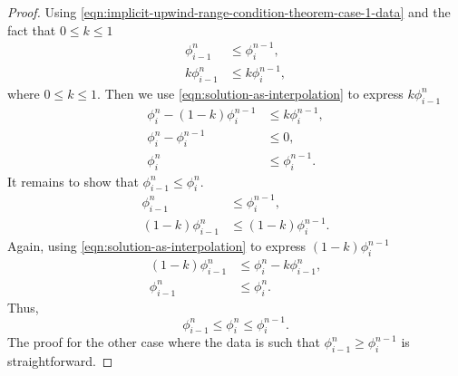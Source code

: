 \documentclass[../thesis.tex]{subfiles}
\begin{document}
\begin{theorem}
\begin{proof}
        Using \eqref{eqn:implicit-upwind-range-condition-theorem-case-1-data} and
        the fact that \(0 \leq k \leq 1\)
        \begin{equation*}
            \begin{split}
                \phi_{i-1}^{n} &\leq \phi_{i}^{n-1},\\
                k \phi_{i-1}^{n} &\leq k \phi_{i}^{n-1},
            \end{split}
        \end{equation*}
        where \(0 \leq k \leq 1\).
        Then we use \eqref{eqn:solution-as-interpolation} to express \(k \phi_{i-1}^{n}\)
        \begin{equation*}
            \begin{split}
                \phi_{i}^{n} - (1-k)\phi_{i}^{n-1} &\leq k \phi_{i}^{n-1},\\
                \phi_{i}^{n} - \phi_{i}^{n-1} &\leq 0,\\
                \phi_{i}^{n} &\leq  \phi_{i}^{n-1}.
            \end{split}
        \end{equation*}
    It remains to show that \(\phi_{i-1}^{n} \leq \phi_{i}^{n}\).
    \begin{equation*}
        \begin{split}
            \phi_{i-1}^{n} &\leq \phi_{i}^{n-1},\\
            (1-k)\phi_{i-1}^{n} &\leq (1-k) \phi_{i}^{n-1}.
        \end{split}
    \end{equation*}
    Again, using \eqref{eqn:solution-as-interpolation} to express \((1-k) \phi_{i}^{n-1}\)
    \begin{equation*}
        \begin{split}
            (1-k)\phi_{i-1}^{n} &\leq \phi_{i}^{n} - k \phi_{i-1}^{n},\\
            \phi_{i-1}^{n} &\leq \phi_{i}^{n}.
        \end{split}
    \end{equation*}
    Thus,
    \[
        \phi_{i-1}^{n} \leq \phi_{i}^{n} \leq \phi_{i}^{n-1}.
    \]
    The proof for the other case where the data is such that \(\phi_{i-1}^{n} \geq \phi_{i}^{n-1}\) is straightforward.
    \end{proof}
\end{theorem}
\end{document}
